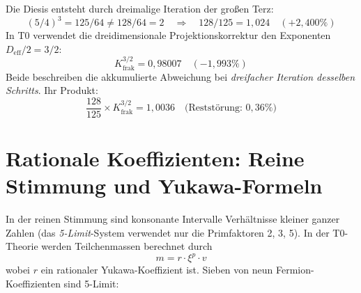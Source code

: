 Die Diesis entsteht durch dreimalige Iteration der großen Terz:
\begin{equation}
	(5/4)^3 = 125/64 \neq 128/64 = 2 \quad \Rightarrow \quad 128/125 = 1{,}024 \quad (+2{,}400\%)
\end{equation}
In T0 verwendet die dreidimensionale Projektionskorrektur den Exponenten $D_\text{eff}/2 = 3/2$:
\begin{equation}
	K_\text{frak}^{3/2} = 0{,}98007 \quad (-1{,}993\%)
\end{equation}
Beide beschreiben die akkumulierte Abweichung bei \emph{dreifacher Iteration desselben Schritts}. Ihr Produkt:
\begin{equation}
	\frac{128}{125} \times K_\text{frak}^{3/2} = 1{,}0036 \quad \text{(Reststörung: } 0{,}36\%\text{)}
\end{equation}

\section{Rationale Koeffizienten: Reine Stimmung und Yukawa-Formeln}

In der reinen Stimmung sind konsonante Intervalle Verhältnisse kleiner ganzer Zahlen (das \emph{5-Limit}-System verwendet nur die Primfaktoren 2, 3, 5). In der T0-Theorie werden Teilchenmassen berechnet durch
\begin{equation}
	m = r \cdot \xi^p \cdot v
\end{equation}
wobei $r$ ein rationaler Yukawa-Koeffizient ist. Sieben von neun Fermion-Koeffizienten sind 5-Limit:

